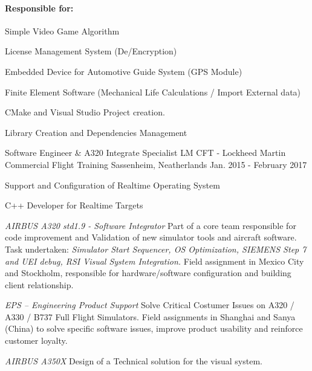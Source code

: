 \begin{cventries}
{\paragraph{Responsible for:}
       \begin{cvitems}     
       \item Simple Video Game Algorithm
       \item License Management System (De/Encryption)
       \item Embedded Device for Automotive Guide System (GPS Module)
       \item Finite Element Software (Mechanical Life Calculations / Import External data)
       \item CMake and Visual Studio Project creation.
       \item Library Creation and Dependencies Management
       \end{cvitems}
    }
    
  \cventry
    {Software Engineer \& A320 Integrate Specialist}
    {LM CFT - Lockheed Martin Commercial Flight Training}
    {Sassenheim, Neatherlands}
    {Jan. 2015 - February 2017}
    {          
      \begin{cvitems}     
      \item{Support and Configuration of Realtime Operating System}
      \item{C++ Developer for Realtime Targets }
      \item {\textit{ AIRBUS A320 std1.9 - Software Integrator} Part of a core team responsible for code improvement and Validation of new simulator tools and aircraft software. Task undertaken: \textit{Simulator Start Sequencer, OS Optimization, SIEMENS Step 7 and  UEI debug, RSI Visual System Integration.} 
      Field assignment in Mexico City and Stockholm, responsible for hardware/software configuration and building client relationship.}
    \item {\textit{EPS – Engineering Product Support} Solve Critical Costumer  Issues on A320 / A330 / B737 Full Flight Simulators. Field assignments in Shanghai and Sanya (China) to  solve specific software issues, improve product usability and reinforce customer loyalty.}
       \item {\textit{AIRBUS A350X}  Design of a Technical solution for the visual system.}
       \end{cvitems}
    }
    

\end{cventries}
